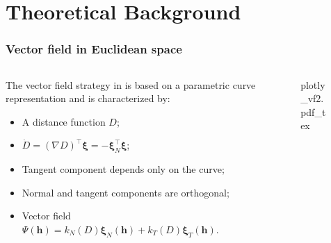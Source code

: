 \section{Theoretical Background}

\begin{frame}
    \frametitle{Vector field in Euclidean space}
    \begin{columns}[c]
        \begin{column}{7cm}
            The vector field strategy in \citet{Rezende2022} is based on a parametric curve representation and is characterized by:
            \begin{itemize}
                \item A distance function $D$;
                \item $\dot{D}=(\nabla D)^\top\boldsymbol{\xi}=-\boldsymbol{\xi}_N^\top\boldsymbol{\xi}$;
                \item Tangent component depends only on the curve;
                \item Normal and tangent components are orthogonal;
                \item Vector field $\Psi(\mathbf{h})=k_N(D)\boldsymbol{\xi}_N(\mathbf{h}) + k_T(D)\boldsymbol{\xi}_T(\mathbf{h})$.
            \end{itemize}
            
        \end{column}
        \begin{column}{8cm}
           \begin{figure}[ht!]
            \centering
            \def\svgwidth{\linewidth}
            {\footnotesize{plotly_vf2.pdf_tex}}
        \end{figure}
        \end{column}
    \end{columns}
\end{frame}
